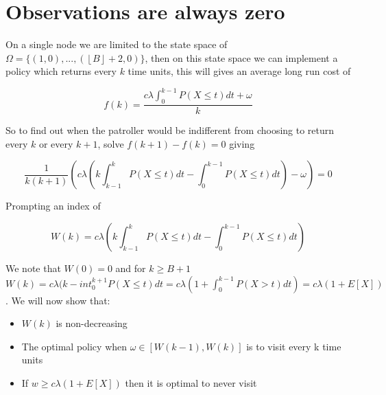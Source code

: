 \documentclass[a4paper,10pt]{article}
\newcommand{\floor}[1]{\left \lfloor #1 \right \rfloor}
\theoremstyle{definition}
\theoremstyle{definition}
\theoremstyle{remark}
\theoremstyle{definition}
\begin{document}


\appendix
{}
\appendixpage
\addappheadtotoc
\section{Observations are always zero}
\label{Observations are always zero}

On a single node we are limited to the state space of $\Omega=\{ (1,0),...,(\floor{B}+2,0) \}$, then on this state space we can implement a policy which returns every $k$ time units, this will gives an average long run cost of

\begin{equation}
f(k)=\frac{c \lambda \int_{0}^{k-1} P(X \leq t) dt +\omega}{k}
\end{equation}

So to find out when the patroller would be indifferent from choosing to return every $k$ or every $k+1$, solve $f(k+1)-f(k)=0$ giving

$$\frac{1}{k(k+1)}(c \lambda (k \int_{k-1}^{k} P(X \leq t) dt - \int_{0}^{k-1} P(X \leq t) dt ) -\omega)=0 $$

Prompting an index of

$$W(k)=c \lambda (k \int_{k-1}^{k} P(X \leq t) dt - \int_{0}^{k-1} P(X \leq t) dt )$$

We note that $W(0)=0$ and for $k \geq B+1$ $W(k)=c \lambda (k - int_{0}^{k+1} P(X \leq t)dt=c \lambda (1+\int_{0}^{k-1} P(X > t)dt)=c \lambda (1+ E[X])$. We will now show that:
\begin{itemize}
\item $W(k)$ is non-decreasing
\item The optimal policy when $\omega \in [W(k-1),W(k)]$ is to visit every k time units
\item If $w \geq c \lambda (1+E[X])$ then it is optimal to never visit
\end{itemize}
\end{document}
